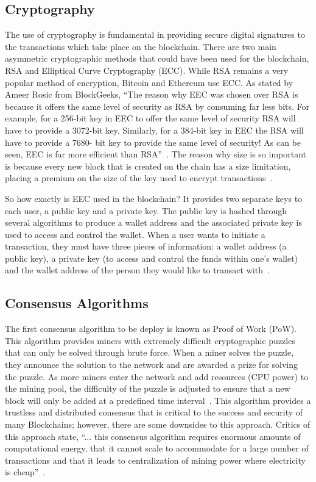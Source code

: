 \subsection{Cryptography}

The use of cryptography is fundamental in providing secure digital signatures to the transactions which take place on the blockchain. There are two main asymmetric cryptographic methods that could have been used for the blockchain, RSA and Elliptical Curve Cryptography (ECC). While RSA remains a very popular method of encryption, Bitcoin and Ethereum use ECC. As stated by Ameer Rosic from BlockGeeks, ``The reason why EEC was chosen over RSA is because it offers the same level of security as RSA by consuming far less bits. For example, for a 256-bit key in EEC to offer the same level of security RSA will have to provide a 3072-bit key. Similarly, for a 384-bit key in EEC the RSA will have to provide a 7680- bit key to provide the same level of security! As can be seen, EEC is far more efficient than RSA''~\cite{hid-sp18-414-www-science-cryptocurrencies-cryptography}. The reason why size is so important is because every new block that is created on the chain has a size limitation, placing a premium on the size of the key used to encrypt transactions~\cite{hid-sp18-414-www-ECDSA-vs-RSA}.

So how exactly is EEC used in the blockchain? It provides two separate keys to each user, a public key and a private key. The public key is hashed through several algorithms to produce a wallet address and the associated private key is used to access and control the wallet. When a user wants to initiate a transaction, they must have three pieces of information: a wallet address (a public key), a private key (to access and control the funds within one's wallet) and the wallet address of the person they would like to transact with~\cite{hid-sp18-414-www-science-cryptocurrencies-cryptography}.

\subsection{Consensus Algorithms}

The first consensus algorithm to be deploy is known as Proof of Work (PoW). This algorithm provides miners with extremely difficult cryptographic puzzles that can only be solved through brute force. When a miner solves the puzzle, they announce the solution to the network and are awarded a prize for solving the puzzle. As more miners enter the network and add resources (CPU power) to the mining pool, the difficulty of the puzzle is adjusted to ensure that a new block will only be added at a predefined time interval~\cite{hid-sp18-414-www-pow-vs-pos}. This algorithm provides a trustless and distributed consensus that is critical to the success and security of many Blockchains; however, there are some downsides to this approach. Critics of this approach state, ``... this consensus algorithm requires enormous amounts of computational energy, that it cannot scale to accommodate for a large number of transactions and that it leads to centralization of mining power where electricity is cheap''~\cite{hid-sp18-414-www-blockchain-consensus-protocols}.

